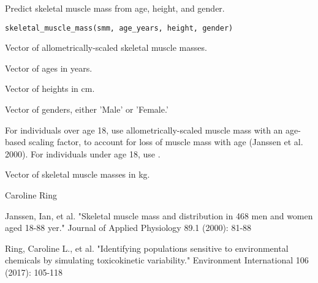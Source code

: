 \documentclass[a4paper]{book}
\begin{document}
%
\begin{Description}\relax
Predict skeletal muscle mass from age, height, and gender.
\end{Description}
%
\begin{Usage}
\begin{verbatim}
skeletal_muscle_mass(smm, age_years, height, gender)
\end{verbatim}
\end{Usage}
%
\begin{Arguments}
\begin{ldescription}
\item[\code{smm}] Vector of allometrically-scaled skeletal muscle masses.

\item[\code{age\_years}] Vector of ages in years.

\item[\code{height}] Vector of heights in cm.

\item[\code{gender}] Vector of genders, either 'Male' or 'Female.'
\end{ldescription}
\end{Arguments}
%
\begin{Details}\relax
For individuals over age 18, use allometrically-scaled muscle mass with an
age-based scaling factor, to account for loss of muscle mass with age
(Janssen et al. 2000). For individuals under age 18, use
.
\end{Details}
%
\begin{Value}
Vector of skeletal muscle masses in kg.
\end{Value}
%
\begin{Author}\relax
Caroline Ring
\end{Author}
%
\begin{References}\relax
Janssen, Ian, et al. "Skeletal muscle mass and distribution in 468 men and
women aged 18-88 yer." Journal of Applied Physiology 89.1 (2000): 81-88

Ring, Caroline L., et al. "Identifying populations sensitive to
environmental chemicals by simulating toxicokinetic variability."
Environment International 106 (2017): 105-118
\end{References}
%
\begin{SeeAlso}\relax
{}
\end{SeeAlso}
\end{document}
